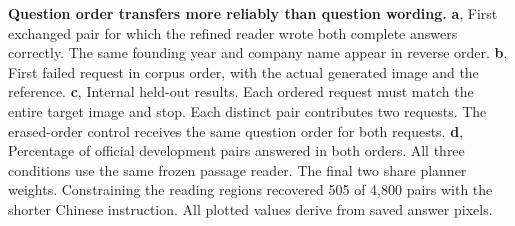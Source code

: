 \textbf{Question order transfers more reliably than question wording.} \textbf{a}, First exchanged pair for which the refined reader wrote both complete answers correctly. The same founding year and company name appear in reverse order. \textbf{b}, First failed request in corpus order, with the actual generated image and the reference. \textbf{c}, Internal held-out results. Each ordered request must match the entire target image and stop. Each distinct pair contributes two requests. The erased-order control receives the same question order for both requests. \textbf{d}, Percentage of official development pairs answered in both orders. All three conditions use the same frozen passage reader. The final two share planner weights. Constraining the reading regions recovered 505 of 4,800 pairs with the shorter Chinese instruction. All plotted values derive from saved answer pixels.
